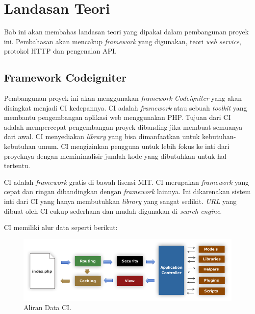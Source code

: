 \chapter{Landasan Teori}
\label{chap:landasanteori}
Bab ini akan membahas landasan teori yang dipakai dalam pembangunan proyek ini. Pembahasan akan mencakup \textit{framework} yang digunakan, teori \textit{web service}, protokol HTTP dan pengenalan API.

\section{Framework Codeigniter}
\label{sec:codeigniter} 

Pembangunan proyek ini akan menggunakan \textit{framework Codeigniter} yang akan disingkat menjadi CI kedepannya. CI adalah \textit{framework} atau sebuah \textit{toolkit} yang membantu pengembangan aplikasi web menggunakan PHP. Tujuan dari CI adalah mempercepat pengembangan proyek dibanding jika membuat semuanya dari awal. CI menyediakan \textit{library} yang bisa dimanfaatkan untuk kebutuhan-kebutuhan umum. CI mengizinkan pengguna untuk lebih fokus ke inti dari proyeknya dengan meminimalisir jumlah kode yang dibutuhkan untuk hal tertentu. ~\cite{ellisLab:20:codeIgniter1}

CI adalah \textit{framework} gratis di bawah lisensi MIT. CI merupakan \textit{framework} yang cepat dan ringan dibandingkan dengan \textit{framework} lainnya. Ini dikarenakan sistem inti dari CI yang hanya membutuhkan \textit{library} yang sangat sedikit. \textit{URL} yang dibuat oleh CI cukup sederhana dan mudah digunakan di \textit{search engine}.

CI memiliki alur data seperti berikut:

\begin{figure}[H]
\center
\includegraphics[width=\textwidth,height=\textheight,keepaspectratio]{Gambar/codeigniterflow.png}
\caption{Aliran Data CI. ~\cite{ellisLab:20:codeIgniter2}}
    \label{img:CIdataflow}
\end{figure}

